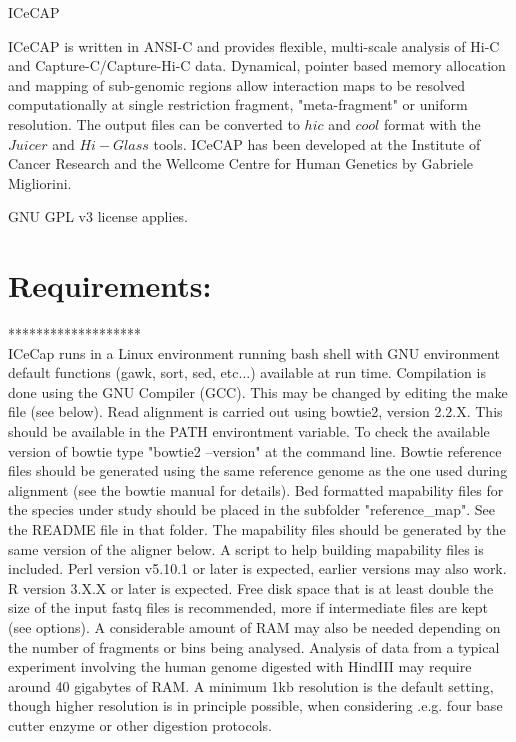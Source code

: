 \documentclass[10pt,a4paper]{article}
\begin{document}
\hspace*{1cm} 
{\huge ICeCAP} 
\vspace*{2cm}

ICeCAP is written in ANSI-C and provides flexible, multi-scale analysis of Hi-C and Capture-C/Capture-Hi-C data. Dynamical, pointer based memory allocation and mapping of sub-genomic regions allow interaction maps to be resolved computationally at single restriction fragment, "meta-fragment" or uniform resolution.
The output files can be converted to $hic$ and $cool$ format with the $Juicer$ and $Hi-Glass$ tools.
ICeCAP has been developed at the Institute of Cancer Research and the Wellcome Centre for Human Genetics by Gabriele Migliorini.

GNU GPL v3 license applies.\\

\section*{Requirements:}
*******************\\
ICeCap runs in a Linux environment running bash shell with GNU environment default functions (gawk, sort, sed, etc...) available at run time.
Compilation is done using the GNU Compiler (GCC).  This may be changed by editing the make file (see below).
Read alignment is carried out using bowtie2, version 2.2.X.  This should be available in the PATH environtment variable.  To check the available version of bowtie type "bowtie2 --version" at the command line.
Bowtie reference files should be generated using the same reference genome as the one used during alignment (see the bowtie manual for details).
Bed formatted mapability files for the species under study should be placed in the subfolder "reference\_map". See the README file in that folder.
The mapability files should be generated by the same version of the aligner below. A script to help building mapability files is included.
Perl version v5.10.1 or later is expected, earlier versions may also work.
R version 3.X.X or later is expected.
Free disk space that is at least double the size of the input fastq files is recommended, more if intermediate files are kept (see options).
A considerable amount of RAM may also be needed depending on the number of fragments or bins being analysed.  Analysis of data from a typical experiment involving the human genome digested with HindIII may require around 40 gigabytes of RAM. A minimum 1kb resolution is the default setting, though higher resolution is in principle possible, when considering .e.g. four base cutter enzyme or other digestion protocols.
\end{document}
